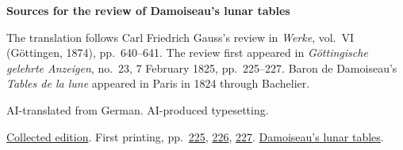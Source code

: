\clearpage\thispagestyle{empty}
\begin{center}\Large\bfseries Sources for the review of Damoiseau’s lunar tables\end{center}

The translation follows Carl Friedrich Gauss’s review in \emph{Werke}, vol.~VI (Göttingen, 1874), pp.~640--641. The review first appeared in \emph{Göttingische gelehrte Anzeigen}, no.~23, 7 February 1825, pp.~225--227. Baron de Damoiseau’s \emph{Tables de la lune} appeared in Paris in 1824 through Bachelier.

AI-translated from German. AI-produced typesetting.

\href{https://gdz.sub.uni-goettingen.de/id/PPN236007467}{Collected edition}. First printing, pp.~\href{https://images.p.sub.uni-goettingen.de/iiif/image/gdz:PPN385030444_1825_1:00000225/full/1650,/0/default.jpg}{225}, \href{https://images.p.sub.uni-goettingen.de/iiif/image/gdz:PPN385030444_1825_1:00000226/full/1650,/0/default.jpg}{226}, \href{https://images.p.sub.uni-goettingen.de/iiif/image/gdz:PPN385030444_1825_1:00000227/full/1650,/0/default.jpg}{227}. \href{https://books.google.it/books?id=uixOAAAAYAAJ&pg=PR3}{Damoiseau’s lunar tables}.

\clearpage
